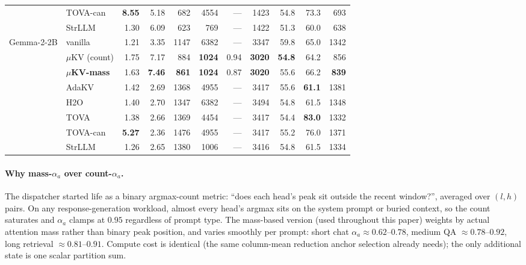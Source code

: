 \documentclass[sigconf, anonymous=false, screen=true]{acmart}
\newcommand{\good}[1]{\textcolor{endurkvgreen}{\textbf{#1}}}
\newcommand{\bad}[1]{\textcolor{endurkvred}{\textbf{#1}}}
\begin{document}
\begin{table}[t]
\begin{tabular}{l l r r r r r r r r r}
 & TOVA-can           & \bad{8.55} & 5.18 & 682 & 4554 & --- & 1423 & 54.8 & 73.3 & 693 \\
 & StrLLM             & 1.30 & 6.09 & 623 & 769 & --- & 1422 & 51.3 & 60.0 & 638 \\
\midrule
\multirow{8}{*}{Gemma-2-2B}
 & vanilla            & 1.21 & 3.35 & 1147 & 6382 & --- & 3347 & 59.8 & 65.0 & 1342 \\
 & $\mu$KV (count)    & 1.75 & 7.17 & 884 & \good{1024} & 0.94 & \good{3020} & \good{54.8} & 64.2 & 856 \\
 & \textbf{$\mu$KV-mass} & 1.63 & \good{7.46} & \good{861} & \good{1024} & 0.87 & \good{3020} & 55.6 & 66.2 & \good{839} \\
 & AdaKV              & 1.42 & 2.69 & 1368 & 4955 & --- & 3417 & 55.6 & \good{61.1} & 1381 \\
 & H2O                & 1.40 & 2.70 & 1347 & 6382 & --- & 3494 & 54.8 & 61.5 & 1348 \\
 & TOVA               & 1.38 & 2.66 & 1369 & 4454 & --- & 3417 & 54.4 & \bad{83.0} & 1332 \\
 & TOVA-can           & \bad{5.27} & 2.36 & 1476 & 4955 & --- & 3417 & 55.2 & 76.0 & 1371 \\
 & StrLLM             & 1.26 & 2.65 & 1380 & 1006 & --- & 3416 & 54.8 & 61.5 & 1334 \\
\bottomrule
\end{tabular}
\end{table}




\paragraph{Why mass-$\alpha_a$ over count-$\alpha_a$.} The dispatcher started life as a binary argmax-count metric: ``does each head's peak sit outside the recent window?'', averaged over $(l, h)$ pairs. On any response-generation workload, almost every head's argmax sits on the system prompt or buried context, so the count saturates and $\alpha_a$ clamps at $0.95$ regardless of prompt type. The mass-based version (used throughout this paper) weights by actual attention mass rather than binary peak position, and varies smoothly per prompt: short chat $\alpha_a \approx 0.62$--$0.78$, medium QA $\approx 0.78$--$0.92$, long retrieval $\approx 0.81$--$0.91$. Compute cost is identical (the same column-mean reduction anchor selection already needs); the only additional state is one scalar partition sum.
\end{document}

